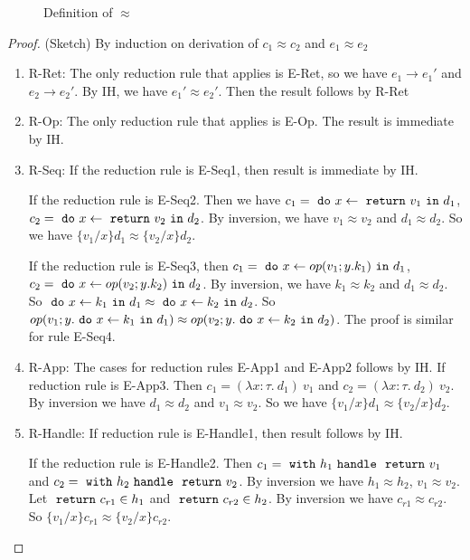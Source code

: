 \begin{theorem}
\begin{figure}[H]
{}
\caption{Definition of $\approx$}
\end{figure}




\begin{proof}(Sketch) By induction on derivation of $c_1 \approx c_2$ and $e_1 \approx e_2$
\begin{enumerate}
\item R-Ret:
  The only reduction rule that applies is E-Ret, so we have $e_1 \longrightarrow e_1'$ and $e_2 \longrightarrow e_2'$. By IH, we have $e_1' \approx e_2'$. Then the result follows by R-Ret
\item R-Op: The only reduction rule that applies is E-Op. The result is immediate by IH.
\item R-Seq: If the reduction rule is E-Seq1, then result is immediate by IH. 

If the reduction rule is E-Seq2. Then we have $c_1 = \ \texttt{do}\  x \leftarrow \ \texttt{return}\  v_1 \ \texttt{in}\  d_1$, $c_2 = \ \texttt{do}\  x \leftarrow \ \texttt{return}\  v_2 \ \texttt{in}\  d_2$. By inversion, we have $v_1 \approx v_2$ and $d_1 \approx d_2$. So we have $\{v_1/x\}d_1 \approx \{v_2/x\}d_2$.

If the reduction rule is E-Seq3, then $c_1 = \ \texttt{do}\  x \leftarrow op(v_1; y. k_1) \ \texttt{in}\  d_1$, $c_2= \ \texttt{do}\  x \leftarrow op(v_2; y. k_2) \ \texttt{in}\  d_2$. By inversion, we have $k_1 \approx k_2$ and $d_1 \approx d_2$. So $\ \texttt{do}\  x \leftarrow k_1 \ \texttt{in}\  d_1 \approx \ \texttt{do}\  x \leftarrow k_2 \ \texttt{in}\  d_2$. So $op(v_1; y. \ \texttt{do}\  x \leftarrow k_1 \ \texttt{in}\  d_1) \approx op(v_2; y. \ \texttt{do}\  x \leftarrow k_2 \ \texttt{in}\  d_2)$. The proof is similar for rule E-Seq4.

\item R-App: The cases for reduction rules E-App1 and E-App2 follows by IH. If reduction rule is E-App3. Then $c_1 = (\lambda x:\tau.\ d_1)\ v_1$ and $c_2 = (\lambda x:\tau.\ d_2)\ v_2$. By inversion we have $d_1 \approx d_2$ and $v_1 \approx v_2$. So we have $\{v_1/x\}d_1 \approx \{v_2/x\}d_2$.

\item R-Handle: If reduction rule is E-Handle1, then result follows by IH. 

If the reduction rule is E-Handle2. Then $c_1 = \ \texttt{with}\  h_1 \ \texttt{handle}\  \ \texttt{return}\  v_1$ and $c_2 = \ \texttt{with}\  h_2 \ \texttt{handle}\  \ \texttt{return}\  v_2$. By inversion we have $h_1 \approx h_2$, $v_1 \approx v_2$.  Let $\ \texttt{return}\  c_{r1} \in h_1$ and $\ \texttt{return}\  c_{r2} \in h_2$. By inversion we have $c_{r1} \approx c_{r2}$. So $\{v_1/x\}c_{r1} \approx \{v_2/x\}c_{r2}$.


\end{enumerate}
\end{proof}
\end{theorem}
